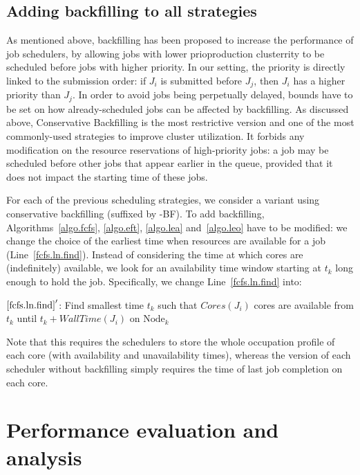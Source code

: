 \documentclass[sigconf,review,anonymous]{acmart}
\newcommand{\Node}[1]{\ensuremath{\mathrm{Node}_{#1}}\xspace}
\newcommand{\core}{\mathit{Cores}\xspace}
\newcommand{\walltime}{\mathit{WallTime}\xspace}
\begin{document}
\subsection{Adding backfilling to all strategies}

As mentioned above, backfilling has been proposed to increase the
performance of job schedulers, by allowing jobs with lower prioproduction clusterrity to be
scheduled before jobs with higher priority. In our setting, the
priority is directly linked to the submission order: if $J_i$ is
submitted before $J_j$, then $J_i$ has a higher priority than $J_j$.
In order to avoid jobs
being perpetually delayed, bounds have to be set on how already-scheduled
jobs can be affected by backfilling. As discussed above,
Conservative Backfilling is the most restrictive version and one of
the most commonly-used strategies to improve cluster utilization. It
forbids any modification on the resource
reservations of high-priority jobs: a job may be scheduled
before other jobs that appear earlier in the queue, provided that it
does not impact the starting time of these jobs.


For each of the previous scheduling strategies, we consider a variant
using conservative backfilling (suffixed by -BF).  To add
backfilling, Algorithms~\ref{algo.fcfs}, \ref{algo.eft},
\ref{algo.lea} and~\ref{algo.leo} have to be modified: we change the
choice of the earliest time when resources are available for a job
(Line~\ref{fcfs.ln.find}). Instead of considering the time at which
cores are (indefinitely) available, we look for an availability time
window starting at $t_k$ long enough to hold the
job. Specifically, we change Line~\ref{fcfs.ln.find} into:
\begin{algorithmic}[0]
  \State $\ref{fcfs.ln.find}'$: Find smallest time $t_k$ such that $\core(J_i)$ cores are
  available from $t_k$ until $t_k + \walltime(J_i)$ on $\Node{k}$
\end{algorithmic}

Note that this requires the schedulers to store  the whole occupation profile of
each core (with availability and unavailability times), whereas the
version of each scheduler without backfilling simply requires the time
of last job completion on each core.

\section{Performance evaluation and analysis}\label{sec.evaluations}
\end{document}
